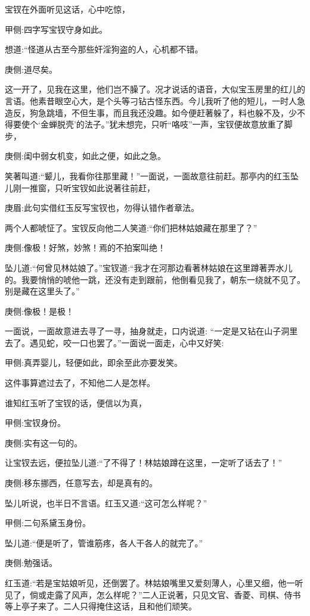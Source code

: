 \begin{parag}
    宝钗在外面听见这话，心中吃惊，\begin{note}甲侧:四字写宝钗守身如此。\end{note}想道:“怪道从古至今那些奸淫狗盗的人，心机都不错。\begin{note}庚侧:道尽矣。\end{note}这一开了，见我在这里，他们岂不臊了。况才说话的语音，大似宝玉房里的红儿的言语。他素昔眼空心大，是个头等刁钻古怪东西。今儿我听了他的短儿，一时人急造反，狗急跳墙，不但生事，而且我还没趣。如今便赶著躲了，料也躲不及，少不得要使个‘金蝉脱壳’的法子。”犹未想完，只听“咯吱”一声，宝钗便故意放重了脚步，\begin{note}庚侧:闺中弱女机变，如此之便，如此之急。\end{note}笑著叫道:“颦儿，我看你往那里藏！”一面说，一面故意往前赶。那亭内的红玉坠儿刚一推窗，只听宝钗如此说著往前赶，\begin{note}庚眉:此句实借红玉反写宝钗也，勿得认错作者章法。\end{note}两个人都唬怔了。宝钗反向他二人笑道:“你们把林姑娘藏在那里了？”\begin{note}庚侧:像极！好煞，妙煞！焉的不拍案叫绝！\end{note}坠儿道:“何曾见林姑娘了。”宝钗道:“我才在河那边看著林姑娘在这里蹲著弄水儿的。我要悄悄的唬他一跳，还没有走到跟前，他倒看见我了，朝东一绕就不见了。别是藏在这里头了。”\begin{note}庚侧:像极！是极！\end{note}一面说，一面故意进去寻了一寻，抽身就走，口内说道: “一定是又钻在山子洞里去了。遇见蛇，咬一口也罢了。”一面说一面走，心中又好笑:\begin{note}甲侧:真弄婴儿，轻便如此，即余至此亦要发笑。\end{note}这件事算遮过去了，不知他二人是怎样。
\end{parag}


\begin{parag}
    谁知红玉听了宝钗的话，便信以为真，\begin{note}甲侧:宝钗身份。\end{note}\begin{note}庚侧:实有这一句的。\end{note}让宝钗去远，便拉坠儿道:“了不得了！林姑娘蹲在这里，一定听了话去了！”\begin{note}庚侧:移东挪西，任意写去，却是真有的。\end{note}坠儿听说，也半日不言语。红玉又道:“这可怎么样呢？”\begin{note}甲侧:二句系黛玉身份。\end{note}坠儿道:“便是听了，管谁筋疼，各人干各人的就完了。”\begin{note}庚侧:勉强话。\end{note}红玉道:“若是宝姑娘听见，还倒罢了。林姑娘嘴里又爱刻薄人，心里又细，他一听见了，倘或走露了风声，怎么样呢？”二人正说著，只见文官、香菱、司棋、侍书等上亭子来了。二人只得掩住这话，且和他们顽笑。
\end{parag}



